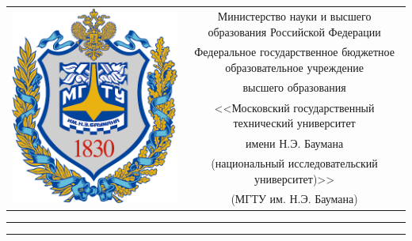\begin{titlepage}
    \centering

     \begin{table}[H]
        \footnotesize
        \bfseries
        \centering
        \begin{tabular}{cc}
            \multirow{7}{*}{\includegraphics[scale=0.15]{images/bmstu_logo.png}}
            & Министерство науки и высшего образования Российской Федерации \\
            & Федеральное государственное бюджетное образовательное учреждение \\
            & высшего образования \\
            & <<Московский государственный технический университет \\
            & имени Н.Э. Баумана \\
            & (национальный исследовательский университет)>> \\
            & (МГТУ им. Н.Э. Баумана) \\
        \end{tabular}
    \end{table}

    \vspace{-2.4cm}

    \begin{flushleft}
        \rule[-1cm]{\textwidth}{0.5pt}
        \rule{\textwidth}{2.5pt}
    \end{flushleft}


\end{titlepage}
